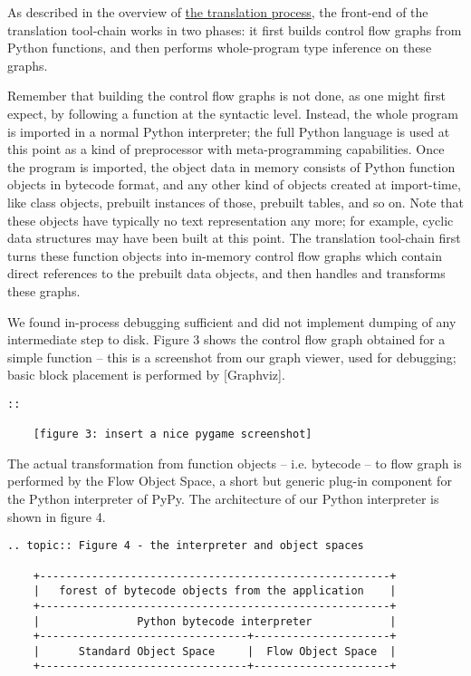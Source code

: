 \documentclass{acm_proc_article-sp}
\begin{document}
As described in the overview of \href{\#the-translation-process}{the
translation process}, the front-end of the translation tool-chain
works in two phases: it first builds control flow graphs from Python
functions, and then performs whole-program type inference on these
graphs.

Remember that building the control flow graphs is not done, as one might
first expect, by following a function at the syntactic level.  Instead,
the whole program is imported in a normal Python interpreter; the full
Python language is used at this point as a kind of preprocessor with
meta-programming capabilities.  Once the program is imported, the object
data in memory consists of Python function objects in bytecode format,
and any other kind of objects created at import-time, like class
objects, prebuilt instances of those, prebuilt tables, and so on.  Note
that these objects have typically no text representation any more; for
example, cyclic data structures may have been built at this point.  The
translation tool-chain first turns these function objects into in-memory
control flow graphs which contain direct references to the prebuilt data
objects, and then handles and transforms these graphs.

We found in-process debugging sufficient and did not implement dumping
of any intermediate step to disk.  Figure 3 shows the control flow graph
obtained for a simple function -- this is a screenshot from our graph
viewer, used for debugging; basic block placement is performed by
[Graphviz].

\begin{verbatim}
::

    [figure 3: insert a nice pygame screenshot]
\end{verbatim}
    
The actual transformation from function objects -- i.e. bytecode -- to
flow graph is performed by the Flow Object Space, a short but generic
plug-in component for the Python interpreter of PyPy.  The architecture
of our Python interpreter is shown in figure 4.

\begin{verbatim}
.. topic:: Figure 4 - the interpreter and object spaces

    +------------------------------------------------------+
    |   forest of bytecode objects from the application    |
    +------------------------------------------------------+
    |               Python bytecode interpreter            |
    +--------------------------------+---------------------+
    |      Standard Object Space     |  Flow Object Space  |
    +--------------------------------+---------------------+
\end{verbatim}
\end{document}
